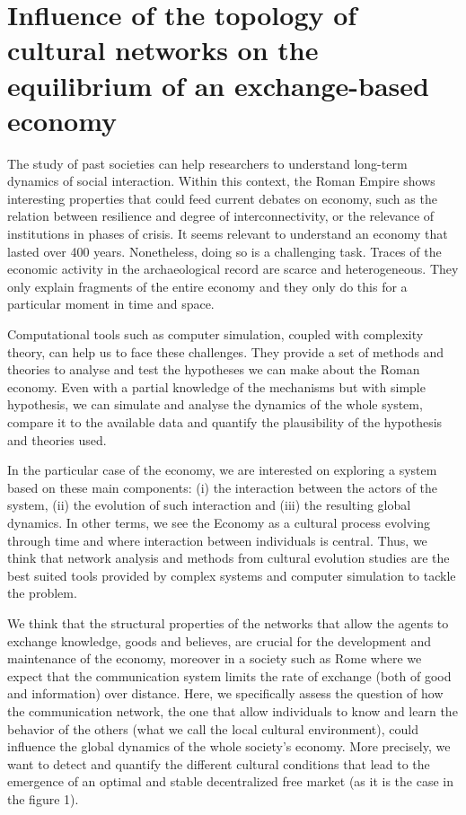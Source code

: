 \documentclass[a4paper,10pt]{report}
\begin{document}
\section*{Influence of the topology of cultural networks  on the equilibrium of an exchange-based economy}

The study of past societies can help researchers to understand long-term dynamics of social interaction. Within this context, the Roman Empire shows  interesting properties that could feed current debates on economy, such as the relation between resilience and degree of interconnectivity, or the relevance of institutions in phases of crisis. It seems relevant to understand an economy that lasted over 400 years. Nonetheless, doing so is a challenging task. Traces of the economic activity in the archaeological record are scarce and heterogeneous. They only explain fragments of the entire economy and they only do this for a particular moment in time and space.

Computational tools such as computer simulation, coupled with complexity theory, can help us to face these challenges. They provide a set of methods and theories to analyse and test the hypotheses we can make about the Roman economy. Even with a partial knowledge of the mechanisms but with simple hypothesis, we can simulate and analyse the dynamics of the whole system, compare it to the available data and quantify the plausibility of the hypothesis and theories used.

In the particular case of the economy, we are interested on exploring a system based on these main components: (i) the interaction between the actors of the system, (ii) the evolution of such interaction and (iii) the resulting global dynamics. In other terms, we see the Economy as a cultural process evolving through time and where interaction between individuals is central. Thus, we think that network analysis and methods from cultural evolution studies are the best suited tools provided by complex systems and computer simulation to tackle the problem. 


We think that the structural properties of the networks that allow the agents to exchange knowledge, goods and believes, are crucial for the development and maintenance of the economy, moreover in a society such as Rome where we expect that the communication system limits the rate of exchange (both of good and information) over distance. Here, we specifically assess the question of how the communication network, the one that allow individuals to know and learn the behavior of the others (what we call the local cultural environment), could influence the global dynamics of the whole society’s economy. More precisely, we want to detect and quantify the different cultural conditions that lead to the emergence of an optimal and stable decentralized free market (as it is the case in the figure 1).
\end{document}
